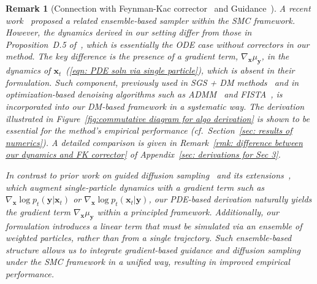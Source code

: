 \documentclass{article}
\numberwithin{equation}{section}
\newtheorem{remark}[theorem]{Remark}
\def\eqref#1{(\ref{#1})}
\def\vx{{\bm{x}}}
\def\vy{{\bm{y}}}
\begin{document}
\begin{remark}[Connection with Feynman-Kac corrector~\cite{skreta2025feynman} and Guidance~\cite{dhariwal2021diffusion,bradley2024classifier}]

    A recent work~\cite{skreta2025feynman} proposed a related ensemble-based sampler within the SMC framework. However, the dynamics derived in our setting differ from those in Proposition~D.5 of~\cite{skreta2025feynman}, which is essentially the ODE case without correctors in our method. The key difference is the presence of a gradient term, $\nabla_{\vx}\mu_{\vy}$, in the dynamics of $\vx_t$~\eqref{eqn: PDE soln via single particle}, which is absent in their formulation. Such component, previously used in SGS + DM methods~\cite{xu2024provably,wu2024principled} and in optimization-based denoising algorithms such as ADMM~\cite{gabay1976dual,wang2008new,boyd2011distributed,sun2016deep,chan2016plug,ryu2019plug} and FISTA~\cite{beck2009fast,zhang2018ista,xiang2021fista}, is incorporated into our DM-based framework in a systematic way. The derivation illustrated in Figure~\ref{fig:commutative diagram for algo derivation} is shown to be essential for the method's empirical performance (\emph{cf.}~Section~\ref{sec: results of numerics}). A detailed comparison is given in Remark~\ref{rmk: difference between our dynamics and FK corrector} of Appendix~\ref{sec: derivations for Sec 3}.

    In contrast to prior work on guided diffusion sampling~\cite{dhariwal2021diffusion,bradley2024classifier,wu2024theoretical,chidambaram2024does} and its extensions~\cite{ho2022classifier,bansal2023universal,song2023loss,he2023manifold,guo2024gradient,lu2024guidance,zheng2024ensemble,ye2024tfg}, which augment single-particle dynamics with a gradient term such as $\nabla_\vx\log p_{t}(\vy|\vx_t)$ or $\nabla_\vx\log p_{t}(\vx_t|\vy)$, our PDE-based derivation naturally yields the gradient term $\nabla_{\vx}\mu_{\vy}$ within a principled framework. Additionally, our formulation introduces a linear term that must be simulated via an ensemble of weighted particles, rather than from a single trajectory. Such ensemble-based structure allows us to integrate gradient-based guidance and diffusion sampling under the SMC framework in a unified way, resulting in improved empirical performance.
\end{remark}
\end{document}
